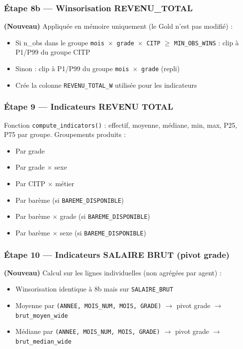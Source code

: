 \documentclass[12pt,a4paper,french]{report}
\begin{document}
\subsubsection{Étape 8b — Winsorisation REVENU\_TOTAL}

\textbf{(Nouveau)} Appliquée en mémoire uniquement (le Gold n'est pas modifié) :
\begin{itemize}
  \item Si n\_obs dans le groupe \texttt{mois $\times$ grade $\times$ CITP}
        $\geq$ \texttt{MIN\_OBS\_WINS} : clip à P1/P99 du groupe CITP
  \item Sinon : clip à P1/P99 du groupe \texttt{mois $\times$ grade} (repli)
  \item Crée la colonne \texttt{REVENU\_TOTAL\_W} utilisée pour les indicateurs
\end{itemize}

\subsubsection{Étape 9 — Indicateurs REVENU TOTAL}

Fonction \texttt{compute\_indicators()} : effectif, moyenne, médiane, min,
max, P25, P75 par groupe. Groupements produits :
\begin{itemize}[nosep]
  \item Par grade
  \item Par grade $\times$ sexe
  \item Par CITP $\times$ métier
  \item Par barème (si \texttt{BAREME\_DISPONIBLE})
  \item Par barème $\times$ grade (si \texttt{BAREME\_DISPONIBLE})
  \item Par barème $\times$ sexe (si \texttt{BAREME\_DISPONIBLE})
\end{itemize}

\subsubsection{Étape 10 — Indicateurs SALAIRE BRUT (pivot grade)}

\textbf{(Nouveau)} Calcul sur les lignes individuelles (non agrégées par agent) :
\begin{itemize}[nosep]
  \item Winsorisation identique à 8b mais sur \texttt{SALAIRE\_BRUT}
  \item Moyenne par \texttt{(ANNEE, MOIS\_NUM, MOIS, GRADE)} $\rightarrow$
        pivot grade $\rightarrow$ \texttt{brut\_moyen\_wide}
  \item Médiane par \texttt{(ANNEE, MOIS\_NUM, MOIS, GRADE)} $\rightarrow$
        pivot grade $\rightarrow$ \texttt{brut\_median\_wide}
\end{itemize}
\end{document}
